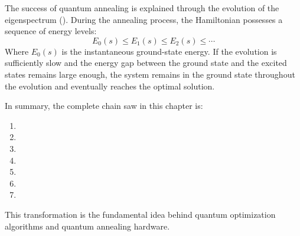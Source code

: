 \highspace
The success of quantum annealing is explained through the evolution of the eigenspectrum (). During the annealing process, the Hamiltonian possesses a sequence of energy levels:
\begin{equation*}
    E_0(s)
    \leq
    E_1(s)
    \leq
    E_2(s)
    \leq
    \cdots
\end{equation*}
Where $E_0(s)$ is the instantaneous ground-state energy. If the evolution is sufficiently slow and the energy gap between the ground state and the excited states remains large enough, the system remains in the ground state throughout the evolution and eventually reaches the optimal solution.

\highspace
In summary, the complete chain saw in this chapter is:
\begin{enumerate}
    \item {}
    \item {}
    \item {}
    \item {}
    \item {}
    \item {}
    \item {}
\end{enumerate}
This transformation is the fundamental idea behind quantum optimization algorithms and quantum annealing hardware.